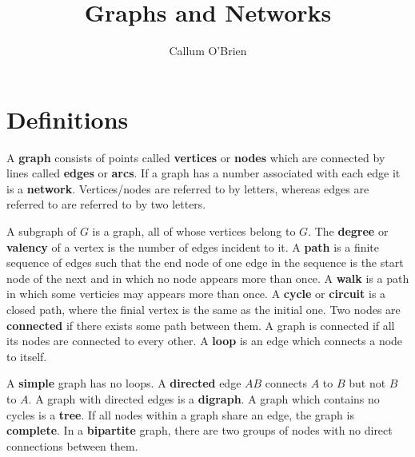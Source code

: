 \documentclass{article}
\title{Graphs and Networks}
\author{Callum O'Brien}
\date{}
\begin{document}
\maketitle
\tableofcontents

\section{Definitions}
A \textbf{graph} consists of points called \textbf{vertices} or \textbf{nodes} which are connected by lines called \textbf{edges} or \textbf{arcs}. If a graph has a number associated with each edge it is a \textbf{network}. Vertices/nodes are referred to by letters, whereas edges are referred to are referred to by two letters.

A subgraph of $G$ is a graph, all of whose vertices belong to $G$. The \textbf{degree} or \textbf{valency} of a vertex is the number of edges incident to it. A \textbf{path} is a finite sequence of edges such that the end node of one edge in the sequence is the start node of the next and in which no node appears more than once. A \textbf{walk} is a path in which some verticies may appears more than once. A \textbf{cycle} or \textbf{circuit} is a closed path, where the finial vertex is the same as the initial one. Two nodes are \textbf{connected} if there exists some path between them. A graph is connected if all its nodes are connected to every other. A \textbf{loop} is an edge which connects a node to itself.

A \textbf{simple} graph has no loops. A \textbf{directed} edge $AB$ connects $A$ to $B$ but not $B$ to $A$. A graph with directed edges is a \textbf{digraph}. A graph which contains no cycles is a \textbf{tree}. If all nodes within a graph share an edge, the graph is \textbf{complete}. In a \textbf{bipartite} graph, there are two groups of nodes with no direct connections between them.
\end{document}
